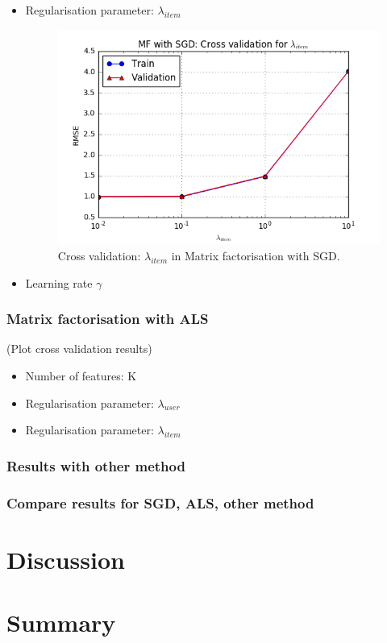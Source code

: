 \documentclass[10pt,conference,compsocconf]{IEEEtran}
\begin{document}
\begin{itemize}
\item Regularisation parameter: $\lambda_{item}$
\begin{figure}[h!]
  \centering
  \includegraphics[width=\columnwidth]{figures/sgd_cv_lambdaItem}
  \caption{Cross validation: $\lambda_{item}$ in Matrix factorisation with SGD.}
  \vspace{-3mm}
  \label{fig:sgd_cv_lambdaItem}
\end{figure}


\item Learning rate $\gamma$
\end{itemize}
\subsubsection{Matrix factorisation with ALS}
(Plot cross validation results)
\begin{itemize}
\item Number of features: K
\item Regularisation parameter: $\lambda_{user}$
\item Regularisation parameter: $\lambda_{item}$
\end{itemize}
\subsubsection{Results with other method}
\subsubsection{Compare results for SGD, ALS, other method}


\section{Discussion}

\section{Summary}


\end{document}

